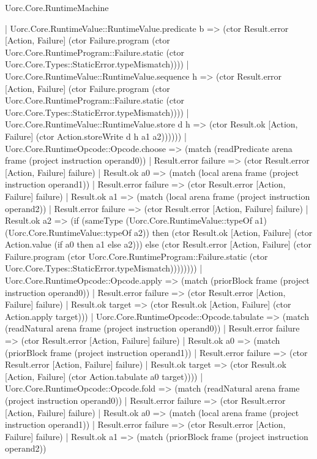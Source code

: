 \begin{lexlean}{Uorc.Core.RuntimeMachine}
\begin{semanticmodule}
{            | Uorc.Core.RuntimeValue::RuntimeValue.predicate b => (ctor Result.error [Action, Failure] (ctor Failure.program (ctor Uorc.Core.RuntimeProgram::Failure.static (ctor Uorc.Core.Types::StaticError.typeMismatch))))
            | Uorc.Core.RuntimeValue::RuntimeValue.sequence h => (ctor Result.error [Action, Failure] (ctor Failure.program (ctor Uorc.Core.RuntimeProgram::Failure.static (ctor Uorc.Core.Types::StaticError.typeMismatch))))
            | Uorc.Core.RuntimeValue::RuntimeValue.store d h => (ctor Result.ok [Action, Failure] (ctor Action.storeWrite d h a1 a2))))))
    | Uorc.Core.RuntimeOpcode::Opcode.choose => (match (readPredicate arena frame (project instruction operand0))
      | Result.error failure => (ctor Result.error [Action, Failure] failure)
      | Result.ok a0 => (match (local arena frame (project instruction operand1))
        | Result.error failure => (ctor Result.error [Action, Failure] failure)
        | Result.ok a1 => (match (local arena frame (project instruction operand2))
          | Result.error failure => (ctor Result.error [Action, Failure] failure)
          | Result.ok a2 => (if (sameType (Uorc.Core.RuntimeValue::typeOf a1) (Uorc.Core.RuntimeValue::typeOf a2)) then (ctor Result.ok [Action, Failure] (ctor Action.value (if a0 then a1 else a2))) else (ctor Result.error [Action, Failure] (ctor Failure.program (ctor Uorc.Core.RuntimeProgram::Failure.static (ctor Uorc.Core.Types::StaticError.typeMismatch))))))))
    | Uorc.Core.RuntimeOpcode::Opcode.apply => (match (priorBlock frame (project instruction operand0))
      | Result.error failure => (ctor Result.error [Action, Failure] failure)
      | Result.ok target => (ctor Result.ok [Action, Failure] (ctor Action.apply target)))
    | Uorc.Core.RuntimeOpcode::Opcode.tabulate => (match (readNatural arena frame (project instruction operand0))
      | Result.error failure => (ctor Result.error [Action, Failure] failure)
      | Result.ok a0 => (match (priorBlock frame (project instruction operand1))
        | Result.error failure => (ctor Result.error [Action, Failure] failure)
        | Result.ok target => (ctor Result.ok [Action, Failure] (ctor Action.tabulate a0 target))))
    | Uorc.Core.RuntimeOpcode::Opcode.fold => (match (readNatural arena frame (project instruction operand0))
      | Result.error failure => (ctor Result.error [Action, Failure] failure)
      | Result.ok a0 => (match (local arena frame (project instruction operand1))
        | Result.error failure => (ctor Result.error [Action, Failure] failure)
        | Result.ok a1 => (match (priorBlock frame (project instruction operand2))
}
\end{semanticmodule}
\end{lexlean}
